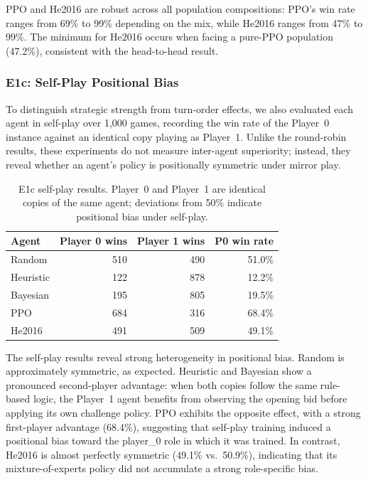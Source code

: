 \documentclass{article}
\begin{document}
  PPO and He2016 are robust across all population compositions: PPO's win rate
  ranges from 69\% to 99\% depending on the mix, while He2016 ranges from 47\% to
  99\%. The minimum for He2016 occurs when facing a pure-PPO population (47.2\%),
  consistent with the head-to-head result.


  
\subsubsection{E1c: Self-Play Positional Bias}

To distinguish strategic strength from turn-order effects, we also evaluated
each agent in self-play over 1{,}000 games, recording the win rate of the
Player~0 instance against an identical copy playing as Player~1. Unlike the
round-robin results, these experiments do not measure inter-agent superiority;
instead, they reveal whether an agent's policy is positionally symmetric under
mirror play.

\begin{table}[h]
\centering
\caption{E1c self-play results. Player~0 and Player~1 are identical copies of
the same agent; deviations from 50\% indicate positional bias under self-play.}
\label{tab:rq1_selfplay}
\begin{tabular}{lrrr}
\toprule
Agent & Player 0 wins & Player 1 wins & P0 win rate \\
\midrule
Random    & 510 & 490 & 51.0\% \\
Heuristic & 122 & 878 & 12.2\% \\
Bayesian  & 195 & 805 & 19.5\% \\
PPO       & 684 & 316 & 68.4\% \\
He2016    & 491 & 509 & 49.1\% \\
\bottomrule
\end{tabular}
\end{table}

The self-play results reveal strong heterogeneity in positional bias. Random is
approximately symmetric, as expected. Heuristic and Bayesian show a pronounced
second-player advantage: when both copies follow the same rule-based logic, the
Player~1 agent benefits from observing the opening bid before applying its own
challenge policy. PPO exhibits the opposite effect, with a strong first-player
advantage (68.4\%), suggesting that self-play training induced a positional bias
toward the player\_0 role in which it was trained. In contrast, He2016 is almost
perfectly symmetric (49.1\% vs.\ 50.9\%), indicating that its mixture-of-experts
policy did not accumulate a strong role-specific bias.
\end{document}

